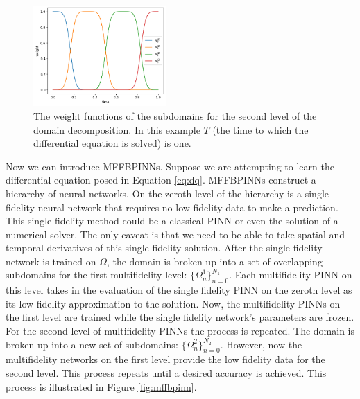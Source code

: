 \documentclass[12pt]{article}
\begin{document}
\begin{figure}
\centering
\includegraphics[width=0.45\textwidth]{imgs/weights}
\caption{The weight functions of the subdomains for the second level of the domain decomposition. In this example $T$ (the time to which the differential equation is solved) is one.}
\label{fig:weights}
\end{figure}

\par Now we can introduce MFFBPINNs. Suppose we are attempting to learn the differential equation posed in Equation \ref{eq:dq}. MFFBPINNs construct a hierarchy of neural networks. On the zeroth level of the hierarchy is a single fidelity neural network that requires no low fidelity data to make a prediction. This single fidelity method could be a classical PINN or even the solution of a numerical solver. The only caveat is that we need to be able to take spatial and temporal derivatives of this single fidelity solution. After the single fidelity network is trained on $\Omega$, the domain is broken up into a set of overlapping subdomains for the first multifidelity level: $\{\Omega^1_n\}_{n=0}^{N_1}$. Each multifidelity PINN on this level takes in the evaluation of the single fidelity PINN on the zeroth level as its low fidelity approximation to the solution. Now, the multifidelity PINNs on the first level are trained while the single fidelity network's parameters are frozen. For the second level of multifidelity PINNs the process is repeated. The domain is broken up into a new set of subdomains: $\{\Omega^2_n\}_{n=0}^{N_2}$. However, now the multifidelity networks on the first level provide the low fidelity data for the second level. This process repeats until a desired accuracy is achieved. This process is illustrated in Figure \ref{fig:mffbpinn}. 
\end{document}
